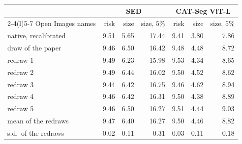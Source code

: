 \begin{tabular}{@{}lrrrrrr@{}}
\toprule
& \multicolumn{3}{c}{SED} & \multicolumn{3}{c}{CAT-Seg ViT-L} \\
\cmidrule(lr){2-4}\cmidrule(l){5-7}
Open Images names & risk & size & size, $5\%$ & risk & size & size, $5\%$ \\
\midrule
native, recalibrated & 9.51 & 5.65 & 17.44 & 9.41 & 3.80 & 7.86 \\
\midrule
draw of the paper & 9.46 & 6.50 & 16.42 & 9.48 & 4.48 & 8.72 \\
redraw 1 & 9.49 & 6.23 & 15.98 & 9.53 & 4.34 & 8.65 \\
redraw 2 & 9.49 & 6.44 & 16.02 & 9.50 & 4.52 & 8.62 \\
redraw 3 & 9.44 & 6.42 & 16.75 & 9.46 & 4.62 & 8.94 \\
redraw 4 & 9.46 & 6.42 & 16.31 & 9.50 & 4.38 & 8.89 \\
redraw 5 & 9.46 & 6.50 & 16.27 & 9.51 & 4.44 & 9.03 \\
\midrule
mean of the redraws & 9.47 & 6.40 & 16.27 & 9.50 & 4.46 & 8.82 \\
s.d.\ of the redraws & 0.02 & 0.11 & 0.31 & 0.03 & 0.11 & 0.18 \\
\bottomrule
\end{tabular}
